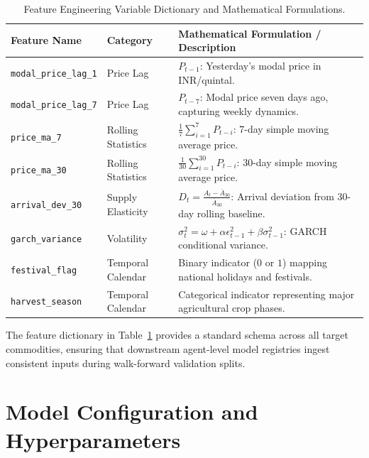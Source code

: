 \documentclass[12pt,a4paper]{report}
\theoremstyle{definition}
\theoremstyle{remark}
\begin{document}
\begin{table}[htbp]
\centering
\caption{Feature Engineering Variable Dictionary and Mathematical Formulations.}
\label{tab:feature_dictionary}
\begin{tabular}{p{3.5cm}|p{3.0cm}|p{7.0cm}}
\hline
\textbf{Feature Name} & \textbf{Category} & \textbf{Mathematical Formulation / Description} \\
\hline
\texttt{modal\_price\_lag\_1} & Price Lag & $P_{t-1}$: Yesterday's modal price in INR/quintal. \\
\texttt{modal\_price\_lag\_7} & Price Lag & $P_{t-7}$: Modal price seven days ago, capturing weekly dynamics. \\
\texttt{price\_ma\_7} & Rolling Statistics & $\frac{1}{7} \sum_{i=1}^{7} P_{t-i}$: 7-day simple moving average price. \\
\texttt{price\_ma\_30} & Rolling Statistics & $\frac{1}{30} \sum_{i=1}^{30} P_{t-i}$: 30-day simple moving average price. \\
\texttt{arrival\_dev\_30} & Supply Elasticity & $D_t = \frac{A_t - \overline{A}_{30}}{\overline{A}_{30}}$: Arrival deviation from 30-day rolling baseline. \\
\texttt{garch\_variance} & Volatility & $\sigma_t^2 = \omega + \alpha \epsilon_{t-1}^2 + \beta \sigma_{t-1}^2$: GARCH conditional variance. \\
\texttt{festival\_flag} & Temporal Calendar & Binary indicator ($0$ or $1$) mapping national holidays and festivals. \\
\texttt{harvest\_season} & Temporal Calendar & Categorical indicator representing major agricultural crop phases. \\
\hline
\end{tabular}
\end{table}

The feature dictionary in Table~\ref{tab:feature_dictionary} provides a standard schema across all target commodities, ensuring that downstream agent-level model registries ingest consistent inputs during walk-forward validation splits.

\chapter{Model Configuration and Hyperparameters}
\label{app:model_configuration}
\end{document}
